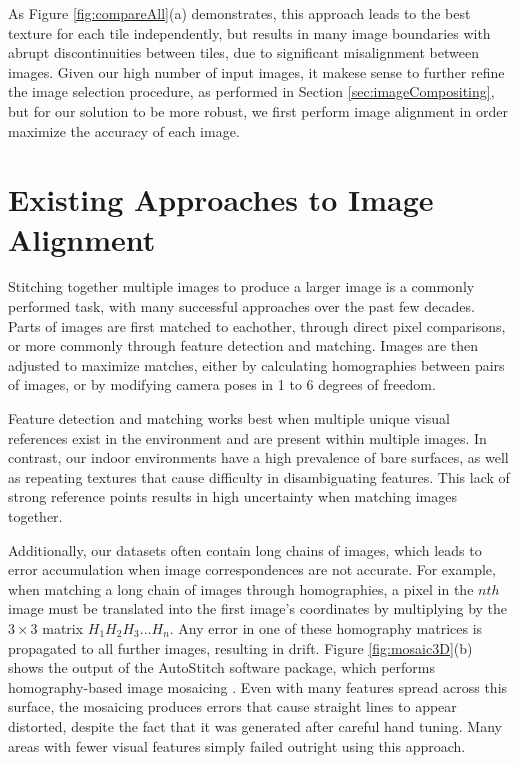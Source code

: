 \documentclass[]{spie}  %
\begin{document}
As Figure \ref{fig:compareAll}(a) demonstrates, this approach leads to
the best texture for each tile independently, but results in many
image boundaries with abrupt discontinuities between tiles, due to
significant misalignment between images. Given our high number of
input images, it makese sense to further refine the image selection
procedure, as performed in Section \ref{sec:imageCompositing}, but for
our solution to be more robust, we first perform image alignment in
order maximize the accuracy of each image.

\section{Existing Approaches to Image Alignment}
\label{sec:existingApproaches}
Stitching together multiple images to produce a larger image is a
commonly performed task, with many successful approaches over the past
few decades. Parts of images are first matched to eachother, through
direct pixel comparisons, or more commonly through feature detection
and matching. Images are then adjusted to maximize matches, either by
calculating homographies between pairs of images, or by modifying
camera poses in 1 to 6 degrees of freedom.

Feature detection and matching works best when multiple unique visual
references exist in the environment and are present within multiple
images. In contrast, our indoor environments have a high prevalence of
bare surfaces, as well as repeating textures that cause difficulty in
disambiguating features. This lack of strong reference points results
in high uncertainty when matching images together.

Additionally, our datasets often contain long chains of images, which
leads to error accumulation when image correspondences are not
accurate. For example, when matching a long chain of images through
homographies, a pixel in the $nth$ image must be translated into the
first image's coordinates by multiplying by the $3\times3$ matrix $H_1
H_2 H_3 ... H_n$. Any error in one of these homography matrices is
propagated to all further images, resulting in drift. Figure
\ref{fig:mosaic3D}(b) shows the output of the AutoStitch software
package, which performs homography-based image mosaicing
\cite{autostitch}. Even with many features spread across this surface,
the mosaicing produces errors that cause straight lines to appear
distorted, despite the fact that it was generated after careful hand
tuning. Many areas with fewer visual features simply failed outright
using this approach.
\end{document}
